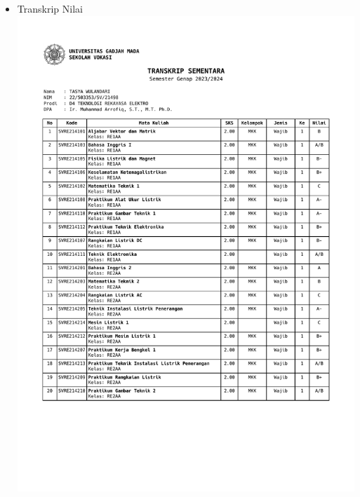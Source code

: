 \begin{itemize}
	\newpage		
	\item Transkrip Nilai\\
	\includegraphics[scale=0.7,page=1]{dokumen/transkrip_tasya.pdf}
	\newpage

\end{itemize}
